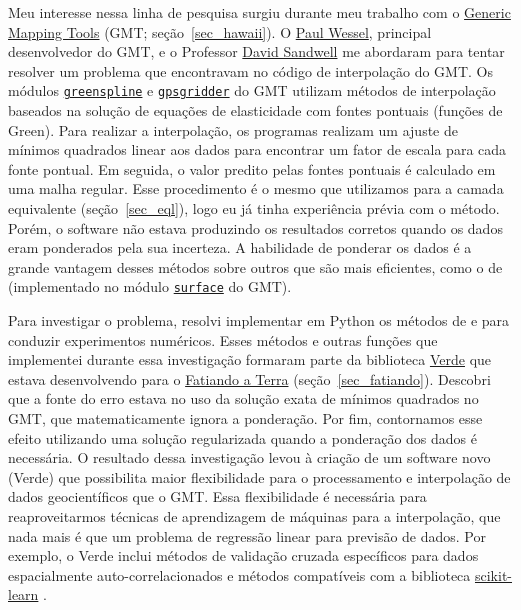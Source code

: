 \documentclass[10pt,a4paper,oneside]{book}
\newcommand{\SandwellLink}{\href{https://topex.ucsd.edu/sandwell/}{David Sandwell}}
\newcommand{\PaulLink}{\href{https://www.soest.hawaii.edu/pwessel/}{Paul Wessel}}
\newcommand{\GMTLink}{\href{https://www.generic-mapping-tools.org}{Generic Mapping Tools}}
\newcommand{\FatiandoLink}{\href{https://www.fatiando.org}{Fatiando a Terra}}
\begin{document}
Meu interesse nessa linha de pesquisa surgiu durante meu trabalho com o
\GMTLink{} (GMT; seção~\ref{sec_hawaii}).
O \PaulLink{}, principal desenvolvedor do GMT, e o Professor \SandwellLink{}
me abordaram para tentar resolver um problema que encontravam no código de
interpolação do GMT.
Os módulos
\href{https://docs.generic-mapping-tools.org/latest/greenspline.html}{\texttt{greenspline}}
e
\href{https://docs.generic-mapping-tools.org/latest/supplements/geodesy/gpsgridder.html}{\texttt{gpsgridder}}
do GMT utilizam métodos de interpolação baseados na solução de equações de
elasticidade com fontes pontuais (funções de Green).
Para realizar a interpolação, os programas realizam um ajuste de mínimos
quadrados linear aos dados para encontrar um fator de escala para cada fonte
pontual.
Em seguida, o valor predito pelas fontes pontuais é calculado em uma malha
regular.
Esse procedimento é o mesmo que utilizamos para a camada equivalente
(seção~\ref{sec_eql}), logo eu já tinha experiência prévia com o método.
Porém, o software não estava produzindo os resultados corretos quando os
dados eram ponderados pela sua incerteza.
A habilidade de ponderar os dados é a grande vantagem desses métodos
sobre outros que são mais eficientes, como o de \citet{Smith1990}
(implementado no módulo
\href{https://docs.generic-mapping-tools.org/latest/surface.html}{\texttt{surface}}
do GMT).

Para investigar o problema, resolvi implementar em Python os métodos de
\citet{Sandwell1987} e \citet{Sandwell2016} para conduzir experimentos
numéricos.
Esses métodos e outras funções que implementei durante essa investigação
formaram parte da biblioteca \href{https://www.fatiando.org/verde}{Verde}
que estava desenvolvendo para o \FatiandoLink{} (seção~\ref{sec_fatiando}).
Descobri que a fonte do erro estava no uso da solução exata de mínimos
quadrados no GMT, que matematicamente ignora a ponderação.
Por fim, contornamos esse efeito utilizando uma solução regularizada quando
a ponderação dos dados é necessária.
O resultado dessa investigação levou à criação de um software novo (Verde) que
possibilita maior flexibilidade para o processamento e interpolação de dados
geocientíficos que o GMT.
Essa flexibilidade é necessária para reaproveitarmos técnicas de aprendizagem
de máquinas para a interpolação, que nada mais é que um problema de regressão
linear para previsão de dados.
Por exemplo, o Verde inclui métodos de validação cruzada específicos para dados
espacialmente auto-correlacionados \citep{Roberts2017} e métodos compatíveis
com a biblioteca \href{https://scikit-learn.org/stable/}{scikit-learn}
\citep{Pedregosa2011}.
\end{document}
